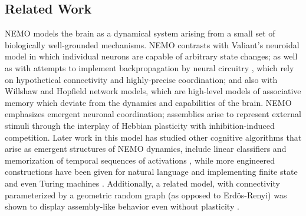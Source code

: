 \documentclass{article}
\theoremstyle{remark}
\newcommand{\1}{\mathbbm{1}}
\begin{document}

\subsection{Related Work}
NEMO models the brain as a dynamical system arising from a small set of biologically well-grounded mechanisms. NEMO contrasts with Valiant's neuroidal model \cite{valiant2000circuits, valiant2005memorization} in which individual neurons are capable of arbitrary state changes; as well as with 
attempts to implement backpropagation by neural circuitry \cite{lillicrap2020backpropagation}, which rely on hypothetical connectivity and highly-precise coordination; and also with Willshaw and Hopfield network models, which are high-level models of associative memory which deviate from the dynamics and capabilities of the brain. NEMO emphasizes emergent neuronal coordination; assemblies arise to represent external stimuli \cite{papadimitriou2019random} through the interplay of Hebbian plasticity with inhibition-induced competition. Later work in this model has studied other cognitive algorithms that arise as emergent structures of NEMO dynamics, include linear classifiers \cite{dabagia2022assemblies} and memorization of temporal sequences of activations \cite{dabagia2024computation}, while more engineered constructions have been given for natural language \cite{mitropolsky2021biologically, mitropolsky2022center, mitropolsky2023architecture} and implementing finite state and even Turing machines \cite{dabagia2024computation}. Additionally, a related model, with connectivity parameterized by a geometric random graph (as opposed to Erd\"os-Renyi) was shown to display assembly-like behavior even without plasticity \cite{reid2023kcap}.

\end{document}
